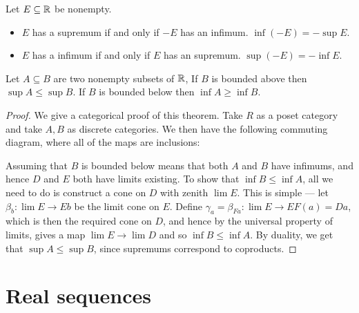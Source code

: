 \begin{theorem}
  Let \(E \subseteq \mathbb{R}\) be nonempty.
  \begin{itemize}
  \item \(E\) has a supremum if and only if \(-E\) has an infimum. \(\inf (-E) = - \sup E\).
  \item \(E\) has a infimum if and only if \(E\) has an supremum. \(\sup (-E) = - \inf E\).
  \end{itemize}
\end{theorem}

\begin{theorem}
  Let \(A \subseteq B\) are two nonempty subsets of \(\mathbb{R}\), If \(B\) is bounded above then \(\sup A \leq \sup B\). If \(B\) is bounded below then \(\inf A \geq \inf B\).
\end{theorem}

\begin{proof}
  We give a categorical proof of this theorem. Take \(R\) as a poset category and take \(A, B\) as discrete categories. We then have the following commuting diagram, where all of the maps are inclusions:
  \begin{centre}
  \end{centre}

  Assuming that \(B\) is bounded below means that both \(A\) and \(B\) have infimums, and hence \(D\) and \(E\) both have limits existing. To show that \(\inf B \leq \inf A\), all we need to do is construct a cone on \(D\) with zenith \(\lim{}{E}\). This is simple --- let \(\beta_{b} : \lim{}{E} \rightarrow E b\) be the limit cone on \(E\). Define \(\gamma_{a} = \beta_{Fa}: \lim{}{E} \rightarrow EF (a) = D a\), which is then the required cone on \(D\), and hence by the universal property of limits, gives a map \(\lim{}{E} \rightarrow \lim{}{D}\) and so \(\inf B \leq \inf A\). By duality, we get that \(\sup A \leq \sup B\), since supremums correspond to coproducts.
\end{proof}

\section{Real sequences}

